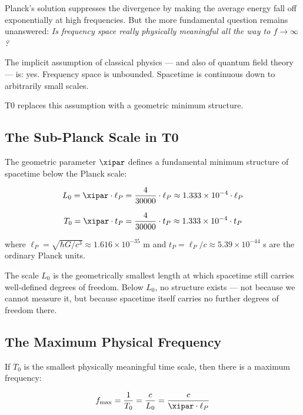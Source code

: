 Planck's solution suppresses the divergence by making the average energy fall off 
exponentially at high frequencies. But the more fundamental question remains 
unanswered: \emph{Is frequency space really physically meaningful all the way to 
$f \to \infty$?}

The implicit assumption of classical physics — and also of quantum field theory — 
is: yes. Frequency space is unbounded. Spacetime is continuous down to arbitrarily 
small scales.

T0 replaces this assumption with a geometric minimum structure.

\subsection{The Sub-Planck Scale in T0}

The geometric parameter $\xipar$ defines a fundamental minimum structure of spacetime 
below the Planck scale:

\begin{equation}
    L_0 = \xipar \cdot \ell_P = \frac{4}{30000} \cdot \ell_P \approx 1.333 \times 10^{-4} \cdot \ell_P
    \label{eq:subplanck_length}
\end{equation}

\begin{equation}
    T_0 = \xipar \cdot t_P = \frac{4}{30000} \cdot t_P \approx 1.333 \times 10^{-4} \cdot t_P
    \label{eq:subplanck_time}
\end{equation}

where $\ell_P = \sqrt{\hbar G/c^3} \approx 1.616 \times 10^{-35}$ m and 
$t_P = \ell_P/c \approx 5.39 \times 10^{-44}$ s are the ordinary Planck units.

The scale $L_0$ is the geometrically smallest length at which spacetime still carries 
well-defined degrees of freedom. Below $L_0$, no structure exists — not because we 
cannot measure it, but because spacetime itself carries no further degrees of freedom 
there.

\subsection{The Maximum Physical Frequency}

If $T_0$ is the smallest physically meaningful time scale, then there is a maximum 
frequency:

\begin{equation}
    f_{\max} = \frac{1}{T_0} = \frac{c}{L_0} = \frac{c}{\xipar \cdot \ell_P}
    \label{eq:f_max}
\end{equation}

